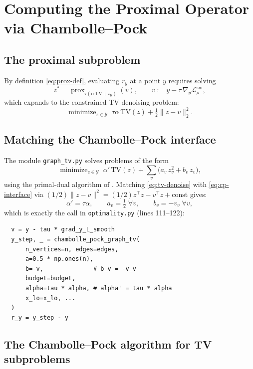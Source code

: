 \documentclass[11pt]{article}
\newcommand{\prox}{\operatorname{prox}}
\newcommand{\TV}{\mathrm{TV}}
\newcommand{\mini}{\mathop{\mathrm{minimize}}}
\theoremstyle{plain}
\theoremstyle{remark}
\begin{document}
\section{Computing the Proximal Operator via Chambolle--Pock}
\label{sec:computation}

\subsection{The proximal subproblem}

By definition \eqref{eq:prox-def}, evaluating $r_y$ at a point $y$ requires
solving
\begin{equation}\label{eq:prox-problem}
  z^* = \prox_{\tau(\alpha\,\TV + \iota_{\mathcal{Y}})}(v),
  \qquad v := y - \tau\,\nabla_y \mathcal{L}^{\mathrm{sm}}_\rho,
\end{equation}
which expands to the constrained TV denoising problem:
\begin{equation}\label{eq:tv-denoise}
  \mini_{z\in\mathcal{Y}}\;
  \tau\alpha\,\TV(z) + \tfrac{1}{2}\|z - v\|_2^2.
\end{equation}

\subsection{Matching the Chambolle--Pock interface}

The module \texttt{graph\_tv.py} solves problems of the form
\begin{equation}\label{eq:cp-interface}
  \mini_{z\in\mathcal{Y}}\;
  \alpha'\,\TV(z) + \sum_v \bigl(a_v\,z_v^2 + b_v\,z_v\bigr),
\end{equation}
using the primal-dual algorithm of \cite{ChaPoc11}.  Matching \eqref{eq:tv-denoise}
with \eqref{eq:cp-interface} via $(1/2)\|z - v\|^2 = (1/2)z^\top z - v^\top z + \mathrm{const}$
gives:
\[
  \alpha' = \tau\alpha,
  \qquad
  a_v = \tfrac{1}{2}\;\forall v,
  \qquad
  b_v = -v_v\;\forall v,
\]
which is exactly the call in \texttt{optimality.py} (lines 111--122):
\begin{verbatim}
  v = y - tau * grad_y_L_smooth
  y_step, _ = chambolle_pock_graph_tv(
      n_vertices=n, edges=edges,
      a=0.5 * np.ones(n),
      b=-v,              # b_v = -v_v
      budget=budget,
      alpha=tau * alpha, # alpha' = tau * alpha
      x_lo=x_lo, ...
  )
  r_y = y_step - y
\end{verbatim}

\subsection{The Chambolle--Pock algorithm for TV subproblems}
\end{document}
